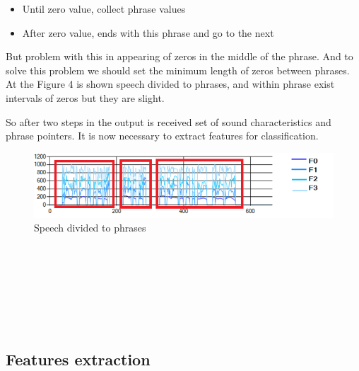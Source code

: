\documentclass[12pt, letterpaper]{article}
\begin{document}
 \begin{itemize}
	 \item Until zero value, collect phrase values
		\item After zero value, ends with this phrase and go to the next
 \end{itemize}

But problem with this in appearing of zeros in the middle of
the phrase. And to solve this problem we should set the minimum length of zeros between phrases. At the Figure 4 is shown speech divided to phrases, and within phrase exist intervals of zeros but they are slight. 

So after two steps in the output is received set of sound characteristics and phrase pointers. It is now necessary to extract features for classification.
\begin{figure}
	\centering
		\includegraphics[scale=1]{images/phrases.png}
	\caption{Speech divided to phrases}
	\label{fig:phrases}
\end{figure}
\\
\\
\\
\\
\\
\\

\subsection{Features extraction}
\end{document}
